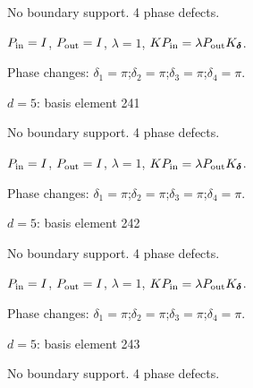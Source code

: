 No boundary support. 4 phase defects.
\begin{center}
\end{center}
\vspace{-1mm}
$P_{\rm in}=I$, \quad $P_{\rm out}=I$, \quad $\lambda=1$, \qquad $K P_{\rm in}=\lambda P_{\rm out}K_{\boldsymbol\delta}$.
\par\smallskip\begin{minipage}{.98\linewidth}\small Phase changes: $\delta_{1}=\pi$;\quad $\delta_{2}=\pi$;\quad $\delta_{3}=\pi$;\quad $\delta_{4}=\pi$.\end{minipage}
\vfill
{\footnotesize\texttt{}}
\newpage
{}
{\Large $d=5$: basis element 241}\par
No boundary support. 4 phase defects.
\begin{center}
\end{center}
\vspace{-1mm}
$P_{\rm in}=I$, \quad $P_{\rm out}=I$, \quad $\lambda=1$, \qquad $K P_{\rm in}=\lambda P_{\rm out}K_{\boldsymbol\delta}$.
\par\smallskip\begin{minipage}{.98\linewidth}\small Phase changes: $\delta_{1}=\pi$;\quad $\delta_{2}=\pi$;\quad $\delta_{3}=\pi$;\quad $\delta_{4}=\pi$.\end{minipage}
\vfill
{\footnotesize\texttt{}}
\newpage
{}
{\Large $d=5$: basis element 242}\par
No boundary support. 4 phase defects.
\begin{center}
\end{center}
\vspace{-1mm}
$P_{\rm in}=I$, \quad $P_{\rm out}=I$, \quad $\lambda=1$, \qquad $K P_{\rm in}=\lambda P_{\rm out}K_{\boldsymbol\delta}$.
\par\smallskip\begin{minipage}{.98\linewidth}\small Phase changes: $\delta_{1}=\pi$;\quad $\delta_{2}=\pi$;\quad $\delta_{3}=\pi$;\quad $\delta_{4}=\pi$.\end{minipage}
\vfill
{\footnotesize\texttt{}}
\newpage
{}
{\Large $d=5$: basis element 243}\par
No boundary support. 4 phase defects.
